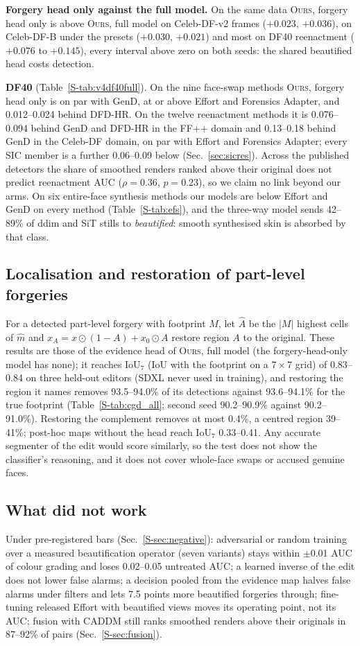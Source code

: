 \documentclass[conference]{IEEEtran}
\newcommand{\oursB}{\textsc{Ours}, forgery head only}
\newcommand{\oursF}{\textsc{Ours}, full model}
\begin{document}
\textbf{Forgery head only against the full model.} On the same data \oursB{} is above \oursF{} on Celeb-DF-v2 frames
($+0.023$, $+0.036$), on Celeb-DF-B under the presets ($+0.030$, $+0.021$) and most on DF40 reenactment ($+0.076$ to $+0.145$),
every interval above zero on both seeds: the shared beautified head costs detection.

\textbf{DF40} (Table~\ref{S-tab:v4df40full}). On the nine face-swap methods \oursB{} is on par with GenD, at or above Effort and
Forensics Adapter, and 0.012--0.024 behind DFD-HR. On the twelve reenactment methods it is 0.076--0.094 behind GenD and DFD-HR in
the FF++ domain and 0.13--0.18 behind GenD in the Celeb-DF domain, on par with Effort and Forensics Adapter; every SIC member
is a further 0.06--0.09 below (Sec.~\ref{sec:sicres}). Across the published detectors the share of smoothed renders ranked
above their original does not predict reenactment AUC ($\rho=0.36$, $p=0.23$), so we claim no link beyond our arms. On six
entire-face synthesis methods our models are below Effort and GenD on every method (Table~\ref{S-tab:efs}), and the three-way
model sends 42--89\% of ddim and SiT stills to \emph{beautified}: smooth synthesised skin is absorbed by that class.

\subsection{Localisation and restoration of part-level forgeries}
\label{sec:cgd}
For a detected part-level forgery with footprint $M$, let $\hat A$ be the $|M|$ highest cells of $\hat m$ and
$x_A=x\odot(1-A)+x_0\odot A$ restore region $A$ to the original. These results are those of the evidence head of \oursF{} (the
forgery-head-only model has none); it reaches
IoU$_7$ (IoU with the footprint on a $7\times7$ grid) of 0.83--0.84 on three held-out editors (SDXL never used in training),
and restoring the region it names removes 93.5--94.0\% of its detections against 93.6--94.1\% for the true footprint
(Table~\ref{S-tab:cgd_all}; second seed 90.2--90.9\% against 90.2--91.0\%). Restoring the complement removes at most 0.4\%, a
centred region 39--41\%; post-hoc maps without the head reach IoU$_7$ 0.33--0.41. Any accurate segmenter of the edit would score
similarly, so the test does not show the classifier's reasoning, and it does not cover whole-face swaps or accused genuine faces.

\subsection{What did not work}
\label{sec:negative}
Under pre-registered bars (Sec.~\ref{S-sec:negative}): adversarial or random training over a measured beautification operator
(seven variants) stays within $\pm$0.01 AUC of colour grading and loses 0.02--0.05 untreated AUC; a learned inverse of the edit
does not lower false alarms; a decision pooled from the evidence map halves false alarms under filters and lets 7.5 points more
beautified forgeries through; fine-tuning released Effort with beautified views moves its operating point, not its AUC; fusion
with CADDM still ranks smoothed renders above their originals in 87--92\% of pairs (Sec.~\ref{S-sec:fusion}).
\end{document}

